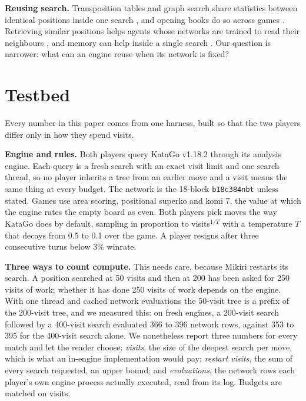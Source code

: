\documentclass{article}
\begin{document}
\textbf{Reusing search.} Transposition tables and graph search share statistics between identical positions inside one search \cite{childs2008transpositions,czech2021improving}, and opening books do so across games \cite{katagobooks}. Retrieving similar positions helps agents whose networks are trained to read their neighbours \cite{humphreys2022retrieval,goyal2022retrieval}, and memory can help inside a single search \cite{xiao2018memory}. Our question is narrower: what can an engine reuse when its network is fixed?

\section{Testbed}
\label{sec:testbed}

Every number in this paper comes from one harness, built so that the two players differ only in how they spend visits.

\textbf{Engine and rules.} Both players query KataGo v1.18.2 through its analysis engine. Each query is a fresh search with an exact visit limit and one search thread, so no player inherits a tree from an earlier move and a visit means the same thing at every budget. The network is the 18-block \texttt{b18c384nbt} unless stated. Games use area scoring, positional superko and komi 7, the value at which the engine rates the empty board as even. Both players pick moves the way KataGo does by default, sampling in proportion to visits$^{1/T}$ with a temperature $T$ that decays from 0.5 to 0.1 over the game. A player resigns after three consecutive turns below 3\% winrate.

\textbf{Three ways to count compute.} This needs care, because Mikiri restarts its search. A position searched at 50 visits and then at 200 has been asked for 250 visits of work; whether it has done 250 visits of work depends on the engine. With one thread and cached network evaluations the 50-visit tree is a prefix of the 200-visit tree, and we measured this: on fresh engines, a 200-visit search followed by a 400-visit search evaluated 366 to 396 network rows, against 353 to 395 for the 400-visit search alone. We nonetheless report three numbers for every match and let the reader choose: \emph{visits}, the size of the deepest search per move, which is what an in-engine implementation would pay; \emph{restart visits}, the sum of every search requested, an upper bound; and \emph{evaluations}, the network rows each player's own engine process actually executed, read from its log. Budgets are matched on visits.
\end{document}
